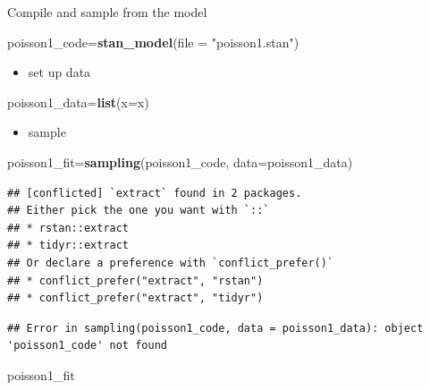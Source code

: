 \documentclass[ignorenonframetext,]{beamer}
\newenvironment{Shaded}{\begin{snugshade}}{\end{snugshade}}
\newcommand{\DataTypeTok}[1]{\textcolor[rgb]{0.13,0.29,0.53}{#1}}
\newcommand{\KeywordTok}[1]{\textcolor[rgb]{0.13,0.29,0.53}{\textbf{#1}}}
\newcommand{\NormalTok}[1]{#1}
\newcommand{\StringTok}[1]{\textcolor[rgb]{0.31,0.60,0.02}{#1}}
\providecommand{\tightlist}{%
  \setlength{\itemsep}{0pt}\setlength{\parskip}{0pt}}
\begin{document}
\begin{frame}[fragile]{Compile and sample from the model}
\protect\hypertarget{compile-and-sample-from-the-model}{}

\begin{Shaded}
\begin{Highlighting}[]
\NormalTok{poisson1_code=}\KeywordTok{stan_model}\NormalTok{(}\DataTypeTok{file =} \StringTok{"poisson1.stan"}\NormalTok{)}
\end{Highlighting}
\end{Shaded}

\begin{itemize}
\tightlist
\item
  set up data
\end{itemize}

\begin{Shaded}
\begin{Highlighting}[]
\NormalTok{poisson1_data=}\KeywordTok{list}\NormalTok{(}\DataTypeTok{x=}\NormalTok{x)}
\end{Highlighting}
\end{Shaded}

\begin{itemize}
\tightlist
\item
  sample
\end{itemize}

\begin{Shaded}
\begin{Highlighting}[]
\NormalTok{poisson1_fit=}\KeywordTok{sampling}\NormalTok{(poisson1_code, }\DataTypeTok{data=}\NormalTok{poisson1_data)}
\end{Highlighting}
\end{Shaded}

\begin{verbatim}
## [conflicted] `extract` found in 2 packages.
## Either pick the one you want with `::` 
## * rstan::extract
## * tidyr::extract
## Or declare a preference with `conflict_prefer()`
## * conflict_prefer("extract", "rstan")
## * conflict_prefer("extract", "tidyr")
\end{verbatim}

\begin{verbatim}
## Error in sampling(poisson1_code, data = poisson1_data): object 'poisson1_code' not found
\end{verbatim}

\begin{Shaded}
\begin{Highlighting}[]
\NormalTok{poisson1_fit}
\end{Highlighting}
\end{Shaded}


\end{frame}
\end{document}
